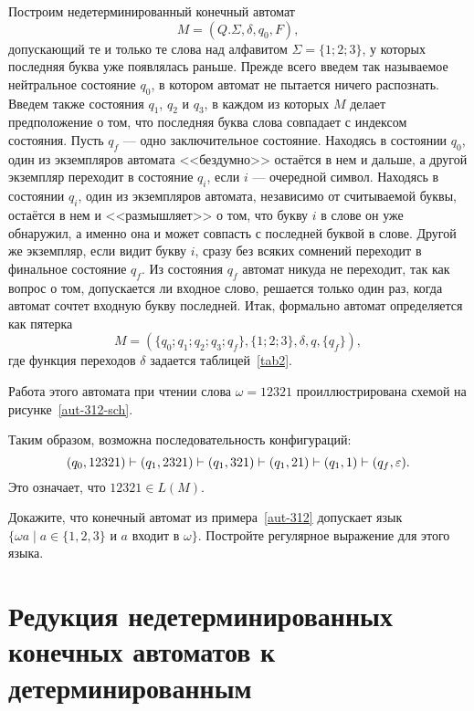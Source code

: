 \begin{myexample}\label{aut-312}
Построим недетерминированный конечный автомат
\[M=(Q.\Sigma,\delta, q_0, F),
\]
допускающий те и только те слова над алфавитом $\Sigma=\{1;2;3\}$, у которых последняя буква уже появлялась раньше. Прежде всего введем так называемое нейтральное состояние $q_0$, в котором автомат не пытается ничего распознать. Введем также состояния $q_1$, $q_2$ и $q_3$, в каждом из которых $M$ делает предположение о том, что последняя буква слова совпадает с индексом состояния. Пусть $q_f$ --- одно заключительное состояние. Находясь в состоянии $q_0$, один из экземпляров автомата <<бездумно>> остаётся в нем и дальше, а другой экземпляр переходит в состояние $q_i$, если $i$ --- очередной символ. Находясь в состоянии $q_i$, один из экземпляров автомата, независимо от считываемой буквы, остаётся в нем и <<размышляет>> о том, что букву $i$ в слове он уже обнаружил, а именно она и может совпасть с последней буквой в слове. Другой же экземпляр, если видит букву $i$, сразу без всяких сомнений переходит в финальное состояние $q_f$. Из состояния $q_f$ автомат никуда не переходит, так как вопрос о том, допускается ли входное слово, решается только один раз, когда автомат сочтет входную букву последней. Итак, формально автомат определяется как пятерка
\[
	M=(\{q_0;q_1;q_2;q_3;q_f\},\{1;2;3\},\delta,q,\{q_f\}),
\]
где функция переходов $\delta$ задается таблицей~\ref{tab2}.



Работа этого автомата при чтении слова $\omega=12321$ проиллюстрирована схемой на рисунке~\ref{aut-312-sch}.



Таким образом, возможна последовательность конфигураций:
\[
(q_0,12321)\vdash(q_1,2321)\vdash(q_1,321)\vdash(q_1,21)\vdash(q_1,1)\vdash(q_f,\varepsilon).
\]
Это означает, что $12321\in L(M)$.
\end{myexample}

\begin{myproblem}
Докажите, что конечный автомат из примера~\ref{aut-312} допускает язык $\{\omega a\mid a\in\{1,2,3\}$ и $a$ входит в $\omega\}$. Постройте регулярное выражение для этого языка.
\end{myproblem}

\section{Редукция недетерминированных конечных автоматов к детерминированным}
\label{Chapter3Reduct}


